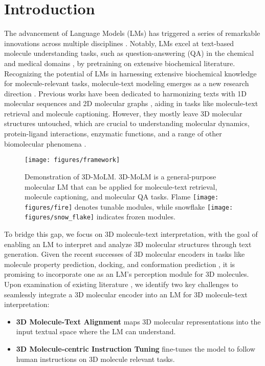 \section{Introduction}
\vspace{-3mm}
The advancement of Language Models (LMs) \citep{bert,gpt4,LLaMA} has triggered a series of remarkable innovations across multiple disciplines \citep{zhao2023survey}. 
Notably, LMs excel at text-based molecule understanding tasks, such as question-answering (QA) in the chemical and medical domains \citep{galactica}, by pretraining on extensive biochemical literature.
Recognizing the potential of LMs in harnessing extensive biochemical knowledge for molecule-relevant tasks,
molecule-text modeling emerges as a new research direction \citep{text2mol,molt5}. 
Previous works have been dedicated to harmonizing texts with 1D molecular sequences \citep{kvplm, galactica} and 2D molecular graphs \citep{liu2023molca, momu, stm}, aiding in tasks like molecule-text retrieval and molecule captioning.
However, they mostly leave 3D molecular structures untouched, which are crucial to understanding molecular dynamics, protein-ligand interactions, enzymatic functions, and a range of other biomolecular phenomena \citep{3D-molecule-1, 3D-molecule-2}.

\begin{figure}[ht]
\centering
\texttt{[image: figures/framework]}
\vspace{-16pt}
\caption{Demonstration of 3D-MoLM. 3D-MoLM is a general-purpose molecular LM that can be applied for molecule-text retrieval, molecule captioning, and molecular QA tasks. 
Flame \texttt{[image: figures/fire]} denotes tunable modules, while snowflake \texttt{[image: figures/snow\_flake]} indicates frozen modules.
}
\vspace{-16pt}
\label{fig:overview}
\end{figure}

To bridge this gap, we focus on 3D molecule-text interpretation, with the goal of enabling an LM to interpret and analyze 3D molecular structures through text generation.
Given the recent successes of 3D molecular encoders in tasks like molecule property prediction, docking, and conformation prediction \citep{uni-mol,uni-mol-plus,GEM}, it is promising to incorporate one as an LM's perception module for 3D molecules. 
Upon examination of existing literature \citep{instructblip,3D-LLM,FlanModel}, 
we identify two key challenges to seamlessly integrate a 3D molecular encoder into an LM for 3D molecule-text interpretation: 
\begin{itemize}[leftmargin=*]
\item \textbf{3D Molecule-Text Alignment} maps 3D molecular representations into the input textual space where the LM can understand. 
\item \textbf{3D Molecule-centric Instruction Tuning} fine-tunes the model to follow human instructions on 3D molecule relevant tasks.
\end{itemize}

